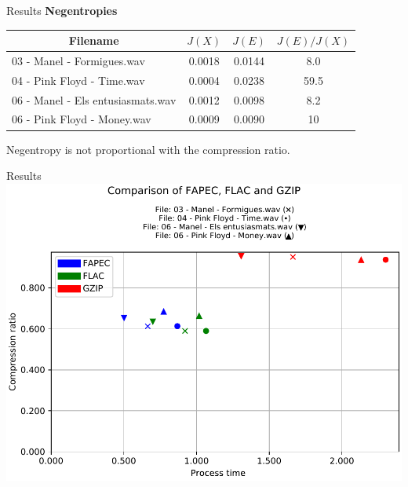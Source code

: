 \documentclass[usenames,dvipsnames]{beamer}
\begin{document}
\begin{frame}{Results}
\textbf{Negentropies}
\vspace{1em}

\small
\begin{tabular}{|
		>{}l |
		>{}c |
		>{}c |c|}
	\hline
	\multicolumn{1}{|c|}{\cellcolor[HTML]{d6cefc}Filename} & \cellcolor[HTML]{d6cefc}$J(X)$ & \cellcolor[HTML]{d6cefc}$J(E)$ & \cellcolor[HTML]{d6cefc}$J(E)/J(X)$ \\ \hline
	03 - Manel - Formigues.wav                             & 0.0018                       & 0.0144                       & 8.0                               \\ \hline
	04 - Pink Floyd - Time.wav                             & 0.0004                       & 0.0238                       & 59.5                              \\ \hline
	06 - Manel - Els entusiasmats.wav                      & 0.0012                       & 0.0098                       & 8.2                               \\ \hline
	06 - Pink Floyd - Money.wav                            & 0.0009                       & 0.0090                       & 10                                \\ \hline
\end{tabular}
\normalsize
\vspace{1.5em}

Negentropy is not proportional with the compression ratio.
\end{frame}

\begin{frame}{Results}
\centering
\includegraphics[scale=0.62]{graphics/2021-05-30T22:30:32.186296-results_wave.csv_comparison.pdf}
\end{frame}
\end{document}
